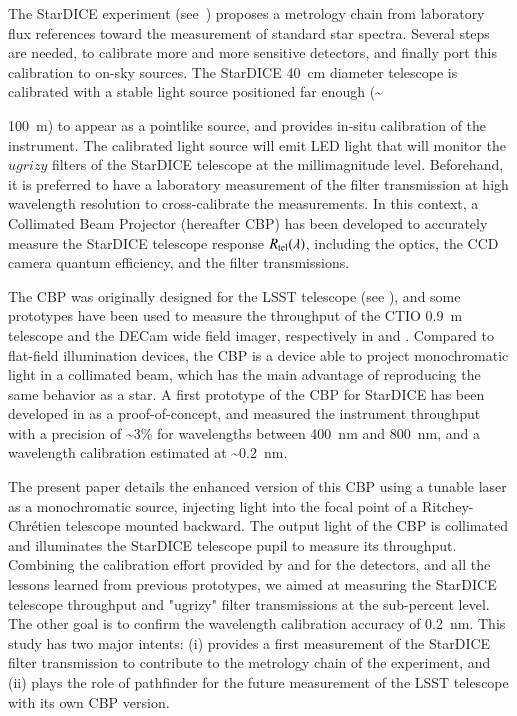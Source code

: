 The StarDICE experiment (see~\cite{Betoule_2023}) proposes a metrology chain from laboratory flux references toward the measurement of standard star spectra. Several steps are needed, to calibrate more and more sensitive detectors, and finally port this calibration to on-sky sources. The StarDICE \SI{40}{\centi\meter} diameter telescope is calibrated with a stable light source positioned far enough (\textasciitilde {\SI{100}{\meter}) to appear as a pointlike source, and provides in-situ calibration of the instrument. The calibrated light source will emit LED light that will monitor the $ugrizy$ filters of the StarDICE telescope at the millimagnitude level. Beforehand, it is preferred to have a laboratory measurement of the filter transmission at high wavelength resolution to cross-calibrate the measurements. In this context, a Collimated Beam Projector (hereafter CBP) has been developed to accurately measure the StarDICE telescope response $R_{\mathrm{tel}}(\lambda)$, including the optics, the CCD camera quantum efficiency, and the filter transmissions. 

The CBP was originally designed for the LSST telescope (see \cite{ingraham2016}), and some prototypes have been used to measure the throughput of the CTIO \SI{0.9}{\meter} telescope and the DECam wide field imager, respectively in \cite{coughlin2018} and \cite{coughlin2016}. Compared to flat-field illumination devices, the CBP is a device able to project monochromatic light in a collimated beam, which has the main advantage of reproducing the same behavior as a star. A first prototype of the CBP for StarDICE has been developed in \cite{Mondrik_2023} as a proof-of-concept, and measured the instrument throughput with a precision of \textasciitilde 3\% for wavelengths between \SI{400}{\nano\meter} and \SI{800}{\nano\meter}, and a wavelength calibration estimated at \textasciitilde \SI{0.2}{\nano\meter}. 

The present paper details the enhanced version of this CBP using a tunable laser as a monochromatic source, injecting light into the focal point of a Ritchey-Chrétien telescope mounted backward. The output light of the CBP is collimated and illuminates the StarDICE telescope pupil to measure its throughput. Combining the calibration effort provided by \cite{houston2008detectors} and \cite{solarcell} for the detectors, and all the lessons learned from previous prototypes, we aimed at measuring the StarDICE telescope throughput and "ugrizy" filter transmissions at the sub-percent level. The other goal is to confirm the wavelength calibration accuracy of \SI{0.2}{\nano\meter}. This study has two major intents: (i) provides a first measurement of the StarDICE filter transmission to contribute to the metrology chain of the experiment, and (ii) plays the role of pathfinder for the future measurement of the LSST telescope with its own CBP version.

}
